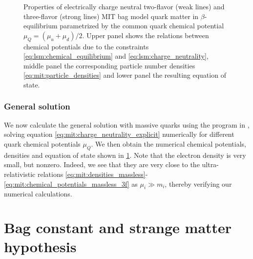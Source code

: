 \begin{figure}
\caption{\label{fig:mit:eos}%
Properties of electrically charge neutral two-flavor (weak lines) and three-flavor (strong lines) MIT bag model quark matter in $\beta$-equilibrium parametrized by the common quark chemical potential $\mu_Q = (\mu_u+\mu_d)/2$.
Upper panel  shows the relations between chemical potentials due to the constraints \eqref{eq:lsm:chemical_equilibrium} and \eqref{eq:lsm:charge_neutrality},
middle panel  the corresponding particle number densities \eqref{eq:mit:particle_densities} and
lower panel  the resulting equation of state.
}
\end{figure}

\subsubsection{General solution}

We now calculate the general solution with massive quarks using the program in ,
solving equation \eqref{eq:mit:charge_neutrality_explicit} numerically for different quark chemical potentials $\mu_Q$.
We then obtain the numerical chemical potentials, densities and equation of state shown in \cref{fig:mit:eos}.
Note that the electron density is very small, but nonzero.
Indeed, we see that they are very close to the ultra-relativistic relations
\eqref{eq:mit:densities_massless}-\eqref{eq:mit:chemical_potentials_massless_3f}
as $\mu_i \gg m_i$, thereby verifying our numerical calculations.


\section{Bag constant and strange matter hypothesis}

